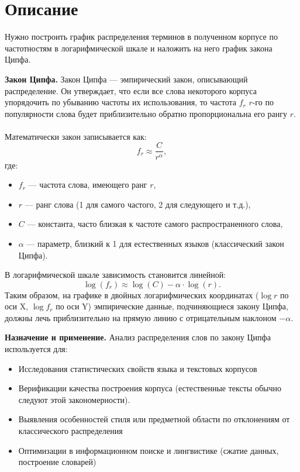 \section{Описание}
Нужно построить график распределения терминов в полученном корпусе по частотностям в логарифмической шкале и наложить на него график закона Ципфа.

\vspace{2em}
\noindent\textbf{Закон Ципфа.} Закон Ципфа --- эмпирический закон, описывающий распределение. Он утверждает, что если все слова некоторого корпуса упорядочить по убыванию частоты их использования, то частота $f_r$ $r$-го по популярности слова будет приблизительно обратно пропорциональна его рангу $r$.
\\ \\
Математически закон записывается как:
\[
f_r \approx \frac{C}{r^{\alpha}},
\]
где:
\begin{itemize}
    \item $f_r$ --- частота слова, имеющего ранг $r$,
    \item $r$ --- ранг слова (1 для самого частого, 2 для следующего и т.д.),
    \item $C$ --- константа, часто близкая к частоте самого распространенного слова,
    \item $\alpha$ --- параметр, близкий к 1 для естественных языков (классический закон Ципфа).
\end{itemize}


В логарифмической шкале зависимость становится линейной:
\[
\log(f_r) \approx \log(C) - \alpha \cdot \log(r).
\]
Таким образом, на графике в двойных логарифмических координатах ($\log r$ по оси X, $\log f_r$ по оси Y) эмпирические данные, подчиняющиеся закону Ципфа, должны лечь приблизительно на прямую линию с отрицательным наклоном $-\alpha$.

\vspace{2em}
\noindent\textbf{Назначение и применение.}
Анализ распределения слов по закону Ципфа используется для:
\begin{itemize}
    \item Исследования статистических свойств языка и текстовых корпусов
    \item Верификации качества построения корпуса (естественные тексты обычно следуют этой закономерности).
    \item Выявления особенностей стиля или предметной области по отклонениям от классического распределения
    \item Оптимизации в информационном поиске и лингвистике (сжатие данных, построение словарей)
\end{itemize}

